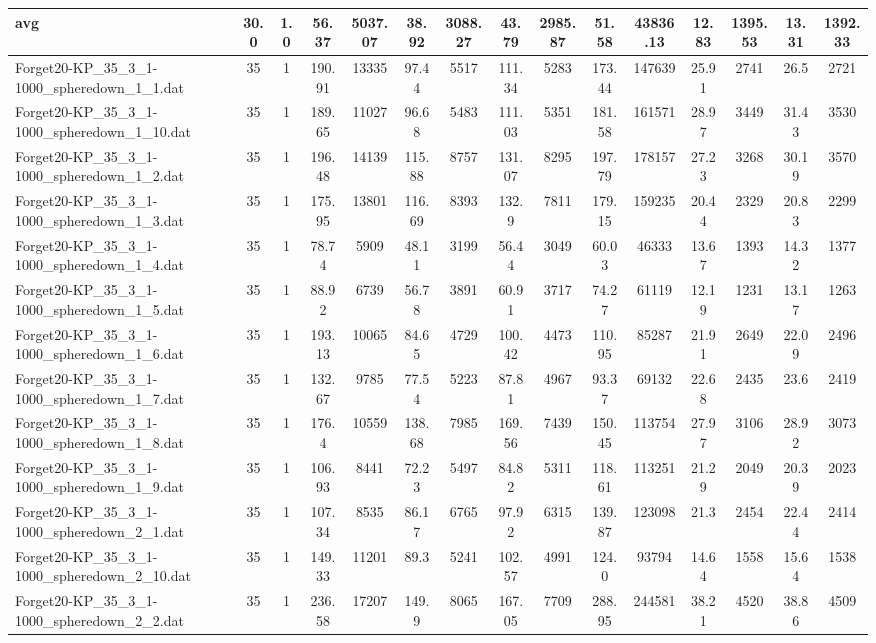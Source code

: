 \begin{table}[!ht]
{\begin{tabular}{lcccccccccccccc}
\hline avg & 30.0 & 1.0 & 56.37& 5037.07 & 38.92& 3088.27 & 43.79& 2985.87 & 51.58& 43836.13 & 12.83& 1395.53 & 13.31& 1392.33\\ \hline
Forget20-KP\_35\_3\_1-1000\_spheredown\_1\_1.dat & 35 & 1 & 190.91 & 13335 & 97.44 & 5517 & 111.34 & 5283 & 173.44 & 147639 & 25.91 & 2741 & 26.5 & 2721 \\
Forget20-KP\_35\_3\_1-1000\_spheredown\_1\_10.dat & 35 & 1 & 189.65 & 11027 & 96.68 & 5483 & 111.03 & 5351 & 181.58 & 161571 & 28.97 & 3449 & 31.43 & 3530 \\
Forget20-KP\_35\_3\_1-1000\_spheredown\_1\_2.dat & 35 & 1 & 196.48 & 14139 & 115.88 & 8757 & 131.07 & 8295 & 197.79 & 178157 & 27.23 & 3268 & 30.19 & 3570 \\
Forget20-KP\_35\_3\_1-1000\_spheredown\_1\_3.dat & 35 & 1 & 175.95 & 13801 & 116.69 & 8393 & 132.9 & 7811 & 179.15 & 159235 & 20.44 & 2329 & 20.83 & 2299 \\
Forget20-KP\_35\_3\_1-1000\_spheredown\_1\_4.dat & 35 & 1 & 78.74 & 5909 & 48.11 & 3199 & 56.44 & 3049 & 60.03 & 46333 & 13.67 & 1393 & 14.32 & 1377 \\
Forget20-KP\_35\_3\_1-1000\_spheredown\_1\_5.dat & 35 & 1 & 88.92 & 6739 & 56.78 & 3891 & 60.91 & 3717 & 74.27 & 61119 & 12.19 & 1231 & 13.17 & 1263 \\
Forget20-KP\_35\_3\_1-1000\_spheredown\_1\_6.dat & 35 & 1 & 193.13 & 10065 & 84.65 & 4729 & 100.42 & 4473 & 110.95 & 85287 & 21.91 & 2649 & 22.09 & 2496 \\
Forget20-KP\_35\_3\_1-1000\_spheredown\_1\_7.dat & 35 & 1 & 132.67 & 9785 & 77.54 & 5223 & 87.81 & 4967 & 93.37 & 69132 & 22.68 & 2435 & 23.6 & 2419 \\
Forget20-KP\_35\_3\_1-1000\_spheredown\_1\_8.dat & 35 & 1 & 176.4 & 10559 & 138.68 & 7985 & 169.56 & 7439 & 150.45 & 113754 & 27.97 & 3106 & 28.92 & 3073 \\
Forget20-KP\_35\_3\_1-1000\_spheredown\_1\_9.dat & 35 & 1 & 106.93 & 8441 & 72.23 & 5497 & 84.82 & 5311 & 118.61 & 113251 & 21.29 & 2049 & 20.39 & 2023 \\
Forget20-KP\_35\_3\_1-1000\_spheredown\_2\_1.dat & 35 & 1 & 107.34 & 8535 & 86.17 & 6765 & 97.92 & 6315 & 139.87 & 123098 & 21.3 & 2454 & 22.44 & 2414 \\
Forget20-KP\_35\_3\_1-1000\_spheredown\_2\_10.dat & 35 & 1 & 149.33 & 11201 & 89.3 & 5241 & 102.57 & 4991 & 124.0 & 93794 & 14.64 & 1558 & 15.64 & 1538 \\
Forget20-KP\_35\_3\_1-1000\_spheredown\_2\_2.dat & 35 & 1 & 236.58 & 17207 & 149.9 & 8065 & 167.05 & 7709 & 288.95 & 244581 & 38.21 & 4520 & 38.86 & 4509 \\

\end{tabular}}
\end{table}
